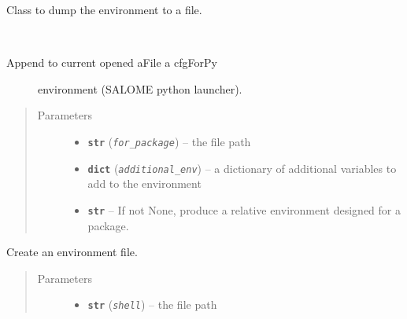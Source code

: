 \documentclass[a4paper,10pt,english]{sphinxmanual}
\begin{document}

\begin{fulllineitems}
\label{commands/apidoc/src:src.environment.FileEnvWriter}
Class to dump the environment to a file.

\begin{fulllineitems}
\label{commands/apidoc/src:src.environment.FileEnvWriter.write_cfgForPy_file}~\begin{description}
\item[{Append to current opened aFile a cfgForPy }] \leavevmode
environment (SALOME python launcher).

\end{description}
\begin{quote}\begin{description}
\item[{Parameters}] \leavevmode\begin{itemize}
\item {} 
\textbf{\texttt{str}} (\emph{\texttt{for\_package}}) -- the file path

\item {} 
\textbf{\texttt{dict}} (\emph{\texttt{additional\_env}}) -- a dictionary of additional variables 
to add to the environment

\item {} 
\textbf{\texttt{str}} -- If not None, produce a relative environment 
designed for a package.

\end{itemize}

\end{description}\end{quote}

\end{fulllineitems}


\begin{fulllineitems}
\label{commands/apidoc/src:src.environment.FileEnvWriter.write_env_file}
Create an environment file.
\begin{quote}\begin{description}
\item[{Parameters}] \leavevmode\begin{itemize}
\item {} 
\textbf{\texttt{str}} (\emph{\texttt{shell}}) -- the file path


\end{itemize}
\end{description}
\end{quote}
\end{fulllineitems}
\end{fulllineitems}
\end{document}
